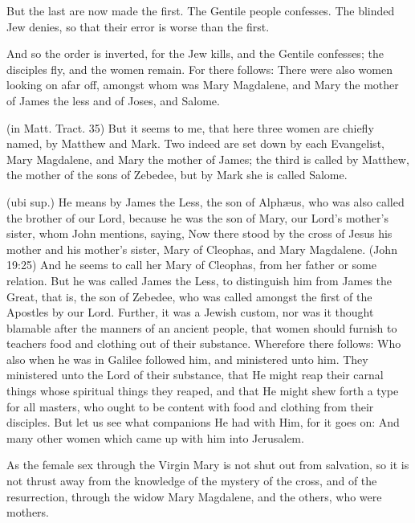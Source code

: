  But the last are now made the first. The Gentile people confesses. The blinded Jew denies, so that their error is worse than the first.

 And so the order is inverted, for the Jew kills, and the Gentile confesses; the disciples fly, and the women remain. For there follows: There were also women looking on afar off, amongst whom was Mary Magdalene, and Mary the mother of James the less and of Joses, and Salome.

 (in Matt. Tract. 35) But it seems to me, that here three women are chiefly named, by Matthew and Mark. Two indeed are set down by each Evangelist, Mary Magdalene, and Mary the mother of James; the third is called by Matthew, the mother of the sons of Zebedee, but by Mark she is called Salome.

 (ubi sup.) He means by James the Less, the son of Alphæus, who was also called the brother of our Lord, because he was the son of Mary, our Lord’s mother’s sister, whom John mentions, saying, Now there stood by the cross of Jesus his mother and his mother’s sister, Mary of Cleophas, and Mary Magdalene. (John 19:25) And he seems to call her Mary of Cleophas, from her father or some relation. But he was called James the Less, to distinguish him from James the Great, that is, the son of Zebedee, who was called amongst the first of the Apostles by our Lord. Further, it was a Jewish custom, nor was it thought blamable after the manners of an ancient people, that women should furnish to teachers food and clothing out of their substance. Wherefore there follows: Who also when he was in Galilee followed him, and ministered unto him. They ministered unto the Lord of their substance, that He might reap their carnal things whose spiritual things they reaped, and that He might shew forth a type for all masters, who ought to be content with food and clothing from their disciples. But let us see what companions He had with Him, for it goes on: And many other women which came up with him into Jerusalem.

 As the female sex through the Virgin Mary is not shut out from salvation, so it is not thrust away from the knowledge of the mystery of the cross, and of the resurrection, through the widow Mary Magdalene, and the others, who were mothers.

 

